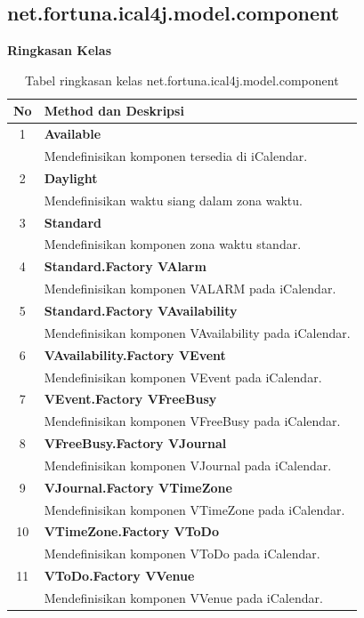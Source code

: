 \subsection{net.fortuna.ical4j.model.component}
\label{subs:net.fortuna.ical4j.model.component}
	\noindent \textbf{Ringkasan Kelas}\cite{ical}
	\begin{table}[H]
		\centering
		\caption{Tabel ringkasan kelas net.fortuna.ical4j.model.component}
		\label{tab:kelas_net.fortuna.ical4j.model.component}
	\begin{tabular}{|c|p{12cm}|}
		\hline
		\textbf{No} & \textbf{Method dan Deskripsi} \\ \hline \hline
		1 & \textbf{Available}\\
			&	Mendefinisikan komponen tersedia di iCalendar.\\ \hline
		2 & \textbf{Daylight}\\
			&	Mendefinisikan waktu siang dalam zona waktu. \\ \hline
		3 & \textbf{Standard}\\
			&	Mendefinisikan komponen zona waktu standar.\\ \hline
		4 & \textbf{Standard.Factory	 
VAlarm}\\
			&	Mendefinisikan komponen VALARM pada iCalendar.\\ \hline
		5 & \textbf{Standard.Factory	 
VAvailability}\\
			&	Mendefinisikan komponen VAvailability pada iCalendar.\\ \hline
		6 & \textbf{VAvailability.Factory	 
VEvent}\\
			&	Mendefinisikan komponen VEvent pada iCalendar.\\ \hline
		7 & \textbf{VEvent.Factory	 
VFreeBusy}\\
			&	Mendefinisikan komponen VFreeBusy pada iCalendar.\\ \hline
		8 & \textbf{VFreeBusy.Factory	 
VJournal}\\
			&	Mendefinisikan komponen VJournal pada iCalendar.\\ \hline
		9 & \textbf{VJournal.Factory	 
VTimeZone}\\
			&	Mendefinisikan komponen VTimeZone pada iCalendar.\\ \hline
		10 & \textbf{VTimeZone.Factory	 
VToDo}\\
			&	Mendefinisikan komponen VToDo pada iCalendar.\\ \hline
		11 & \textbf{VToDo.Factory	 
VVenue}\\
			&	Mendefinisikan komponen VVenue pada iCalendar.\\ \hline	
	\end{tabular}
\end{table}
	
